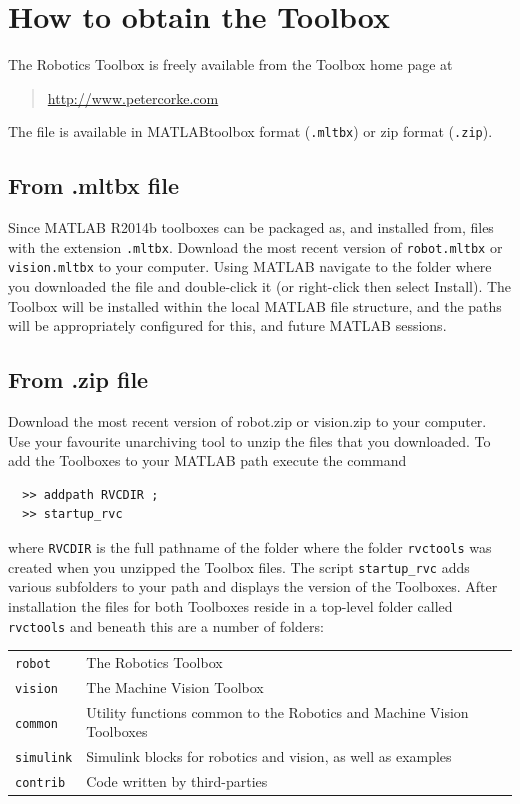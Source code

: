 \documentclass[a4paper,twoside]{report}
\def\Mlab{MATLAB}
\begin{document}
\section{How to obtain the Toolbox}
The Robotics Toolbox is freely available from the Toolbox home
page at 
\begin{quote}
\url{http://www.petercorke.com}
\end{quote}


The file is available in \Mlab toolbox format (\texttt{.mltbx}) or zip format (\texttt{.zip}). 

\subsection{From .mltbx file}
Since MATLAB R2014b toolboxes can be packaged as, and installed from, files with the extension \texttt{.mltbx}. Download the most recent version of \texttt{robot.mltbx} or \texttt{vision.mltbx} to your computer. Using MATLAB navigate to the folder where you downloaded the file and double-click it (or right-click then select Install). The Toolbox will be installed within the local MATLAB file structure, and the paths will be appropriately configured for this, and future MATLAB sessions.

\subsection{From .zip file}
Download the most recent version of robot.zip or vision.zip to your computer. Use your favourite unarchiving tool to unzip the files that you downloaded.
To add the Toolboxes to your MATLAB path execute the command
\begin{verbatim}
  >> addpath RVCDIR ;
  >> startup_rvc
\end{verbatim}
where \texttt{RVCDIR} is the full pathname of the folder where the folder \texttt{rvctools} was created when you unzipped the Toolbox files. The script \texttt{startup\_rvc} adds various subfolders to your path and displays the version of the Toolboxes.
After installation the files for both Toolboxes reside in a top-level folder called \texttt{rvctools} and beneath this are a number of folders:

\begin{tabular}{ll}
\texttt{robot} & The Robotics Toolbox \\
\texttt{vision} & The Machine Vision Toolbox\\
\texttt{common} & Utility functions common to the Robotics and Machine Vision Toolboxes\\
\texttt{simulink}  & Simulink blocks for robotics and vision, as well as examples \\
\texttt{contrib} & Code written by third-parties\\
\end{tabular}
\end{document}
